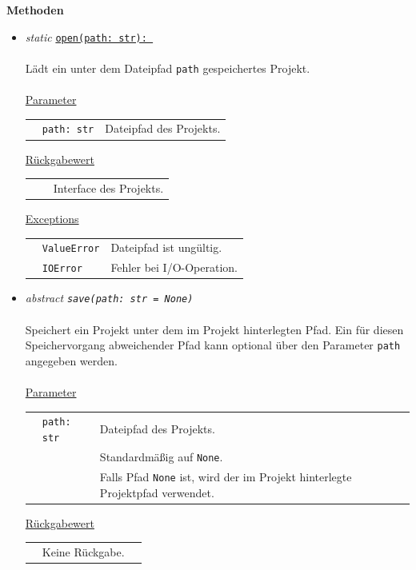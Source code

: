 \documentclass{article}
\newcommand{\classref}[1]{\texttt{\nameref{cls:#1}}}
\begin{document}
\textbf{Methoden}
\begin{itemize}\setlength\itemsep{3em}
\item \textit{\flqq{}static\frqq} \texttt{\underline{open(path: str): \classref{Project}}}\\\\
Lädt ein unter dem Dateipfad \texttt{path} gespeichertes Projekt.
\\\\
\underline{Parameter}\\
\begin{tabular}{lll}
 & \texttt{path: str} & Dateipfad des Projekts.\\
\end{tabular}

\underline{Rückgabewert}\\
\begin{tabular}{lll}
 & \classref{Project} & Interface des Projekts.\\
\end{tabular}

\underline{Exceptions}\\
\begin{tabular}{lll}
 & \texttt{ValueError} & Dateipfad ist ungültig.\\
 & \texttt{IOError} & Fehler bei I/O-Operation.\\
\end{tabular}


\item \textit{\flqq{}abstract\frqq} \texttt{\textit{save(path: str = None)}}\\\\
Speichert ein Projekt unter dem im Projekt hinterlegten Pfad. Ein für diesen Speichervorgang abweichender Pfad kann optional über den Parameter \texttt{path} angegeben werden.
\\\\
\underline{Parameter}\\
\begin{tabular}{lll}
 & \texttt{path: str} & Dateipfad des Projekts.\\
 && Standardmäßig auf \texttt{None}.\\
 && Falls Pfad \texttt{None} ist, wird der im Projekt hinterlegte Projektpfad verwendet.\\
\end{tabular}

\underline{Rückgabewert}\\
\begin{tabular}{lll}
 & Keine Rückgabe.\\
\end{tabular}


\end{itemize}
\end{document}

